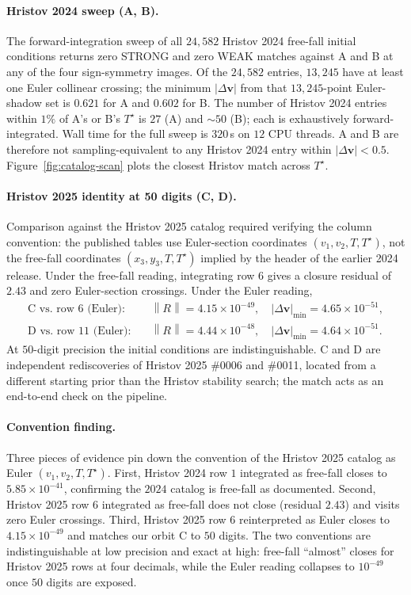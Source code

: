 \documentclass[10pt]{article}
\newcommand{\vvec}{\mathbf{v}}
\newcommand{\Norm}[1]{\left\lVert#1\right\rVert}
\newcommand{\Tstar}{T^{\star}}
\begin{document}
\paragraph{Hristov 2024 sweep (A, B).}
The forward-integration sweep of all $24{,}582$ Hristov 2024 free-fall
initial conditions returns zero STRONG and zero WEAK matches against
A and B at any of the four sign-symmetry images. Of the $24{,}582$
entries, $13{,}245$ have at least one Euler collinear crossing; the
minimum $|\Delta \vvec|$ from that $13{,}245$-point Euler-shadow set
is $0.621$ for A and $0.602$ for B. The number of Hristov 2024
entries within $1\%$ of A's or B's $\Tstar$ is $27$ (A) and $\sim\!50$
(B); each is exhaustively forward-integrated. Wall time for the full
sweep is $320$\,s on $12$ CPU threads. A and B are therefore not
sampling-equivalent to any Hristov 2024 entry within
$|\Delta \vvec| < 0.5$. Figure~\ref{fig:catalog-scan} plots the
closest Hristov match across $\Tstar$.

\paragraph{Hristov 2025 identity at 50 digits (C, D).}
\label{sec:hristov}
Comparison against the Hristov 2025 catalog required verifying the
column convention: the published tables use Euler-section coordinates
$(v_1, v_2, T, \Tstar)$, not the free-fall coordinates
$(x_3, y_3, T, \Tstar)$ implied by the header of the earlier 2024
release. Under the free-fall reading, integrating row $6$ gives a
closure residual of $2.43$ and zero Euler-section crossings. Under
the Euler reading,
\begin{align*}
\text{C vs.\ row 6 (Euler):}\quad &
  \Norm{R} = 4.15\times 10^{-49},\quad
  |\Delta \vvec|_{\min} = 4.65\times 10^{-51}, \\
\text{D vs.\ row 11 (Euler):}\quad &
  \Norm{R} = 4.44\times 10^{-48},\quad
  |\Delta \vvec|_{\min} = 4.64\times 10^{-51}.
\end{align*}
At $50$-digit precision the initial conditions are indistinguishable.
C and D are independent rediscoveries of Hristov 2025 \#0006 and
\#0011, located from a different starting prior than the Hristov
stability search; the match acts as an end-to-end check on the
pipeline.

\paragraph{Convention finding.}
Three pieces of evidence pin down the convention of the Hristov 2025
catalog as Euler $(v_1, v_2, T, \Tstar)$. First, Hristov 2024 row $1$
integrated as free-fall closes to $5.85 \times 10^{-41}$, confirming
the $2024$ catalog is free-fall as documented. Second, Hristov 2025
row $6$ integrated as free-fall does not close (residual $2.43$) and
visits zero Euler crossings. Third, Hristov 2025 row $6$ reinterpreted
as Euler closes to $4.15 \times 10^{-49}$ and matches our orbit C to
$50$ digits. The two conventions are indistinguishable at low
precision and exact at high: free-fall ``almost'' closes for Hristov
2025 rows at four decimals, while the Euler reading collapses to
$10^{-49}$ once $50$ digits are exposed.
\end{document}

